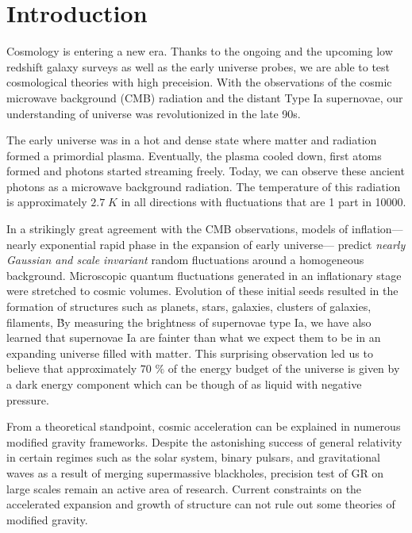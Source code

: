 \chapter*{Introduction}

Cosmology is entering a new era. Thanks to the ongoing and 
the upcoming low redshift galaxy surveys as well as the early universe probes, 
we are able to test cosmological theories with high preceision.
With the observations of the cosmic microwave background (CMB) radiation 
and the distant Type Ia supernovae, our understanding of universe was 
revolutionized in the late 90s. 

The early universe was in a hot and dense state where 
matter and radiation formed a primordial plasma. Eventually, the 
plasma cooled down, first atoms formed and photons started streaming freely.  
Today, we can observe these ancient photons as a microwave background radiation. 
The temperature of this radiation is approximately $2.7 \; K$ in all directions with 
fluctuations that are 1 part in 10000.

In a strikingly great agreement with the CMB observations, models of inflation---nearly 
exponential rapid phase in the expansion of early universe--- 
predict \emph{nearly Gaussian and scale invariant} random fluctuations around a homogeneous 
background. Microscopic quantum fluctuations generated in an inflationary 
stage were stretched to cosmic volumes. Evolution of these initial seeds 
resulted in the formation of structures such as planets, stars, galaxies, clusters of galaxies, filaments, \etc\.

By measuring the brightness of supernovae type Ia, we have also learned 
that supernovae Ia are fainter than what we expect them to be in an 
expanding universe filled with matter. This surprising observation led us to 
believe that approximately 70 $\%$ of the energy budget of the universe is 
given by a dark energy component which can be though of as liquid with negative pressure.

From a theoretical standpoint, cosmic acceleration can be explained in numerous modified gravity frameworks. 
Despite the astonishing success of general relativity in certain regimes such as 
the solar system, binary pulsars, and gravitational waves as a result of merging supermassive blackholes, 
precision test of GR on large scales remain an active area of research. Current constraints on 
the accelerated expansion and growth of structure can not rule out some theories of 
modified gravity.
 
